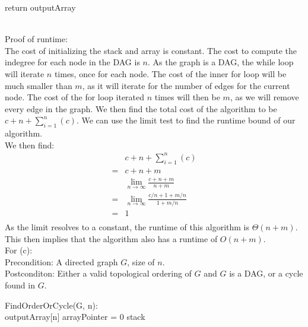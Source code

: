 \documentclass{assignment}
\begin{document}
\begin{problemlist}
\begin{answer}
\begin{algorithm}
{{{      }
    }
    return outputArray\;
  }
\end{algorithm}
\\
Proof of runtime:\\
The cost of initializing the stack and array is constant. The cost to compute the indegree for each node in the DAG is $n$. As the graph is a DAG, the while loop will iterate $n$ times, once for each node. The cost of the inner for loop will be much smaller than $m$, as it will iterate for the number of edges for the current node. The cost of the for loop iterated $n$ times will then be $m$, as we will remove every edge in the graph. We then find the total cost of the algorithm to be $c + n + \sum_{i=1}^n(c)$. We can use the limit test to find the runtime bound of our algorithm.\\
We then find:
\begin{align*}
&c + n + \sum_{i=1}^n(c)\\
=&c + n + m\\
&\lim_{n\rightarrow \infty} \frac{c + n + m}{n + m}\\
=&\lim_{n\rightarrow \infty} \frac{c/n + 1 + m/n}{1 + m/n}\\
=& 1\\
\end{align*}
As the limit resolves to a constant, the runtime of this algorithm is $\Theta(n+m)$. This then implies that the algorithm also has a runtime of $O(n+m)$.\\
\clearpage
For (c):\\
Precondition: A directed graph $G$, size of $n$.\\
Postconditon: Either a valid topological ordering of $G$ and $G$ is a DAG, or a cycle found in $G$.\\
\begin{algorithm}
  FindOrderOrCycle(G, n):{\\
    outputArray[n]\;
    arrayPointer = 0\;
    stack\;
  }
\end{algorithm}
\clearpage
\begin{algorithm}

\end{algorithm}
\end{answer}
\end{problemlist}
\end{document}
